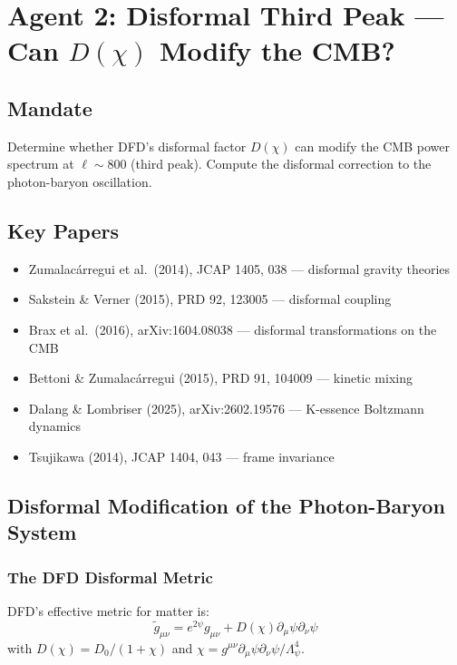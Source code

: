 \documentclass[11pt,a4paper]{article}
\begin{document}
\newpage
\section{Agent 2: Disformal Third Peak --- Can $D(\chi)$ Modify the CMB?}
\label{sec:agent2}

\subsection{Mandate}

Determine whether DFD's disformal factor $D(\chi)$ can modify the CMB power spectrum at $\ell \sim 800$ (third peak). Compute the disformal correction to the photon-baryon oscillation.

\subsection{Key Papers}

\begin{itemize}
\item Zumalac\'{a}rregui et al.\ (2014), JCAP 1405, 038 --- disformal gravity theories
\item Sakstein \& Verner (2015), PRD 92, 123005 --- disformal coupling
\item Brax et al.\ (2016), arXiv:1604.08038 --- disformal transformations on the CMB
\item Bettoni \& Zumalac\'{a}rregui (2015), PRD 91, 104009 --- kinetic mixing
\item Dalang \& Lombriser (2025), arXiv:2602.19576 --- K-essence Boltzmann dynamics
\item Tsujikawa (2014), JCAP 1404, 043 --- frame invariance
\end{itemize}

\subsection{Disformal Modification of the Photon-Baryon System}

\subsubsection{The DFD Disformal Metric}

DFD's effective metric for matter is:
\begin{equation}
\tilde{g}_{\mu\nu} = e^{2\psi}g_{\mu\nu} + D(\chi)\partial_\mu\psi\partial_\nu\psi
\end{equation}
with $D(\chi) = D_0/(1 + \chi)$ and $\chi = g^{\mu\nu}\partial_\mu\psi\partial_\nu\psi/\Lambda_\psi^4$.
\end{document}
